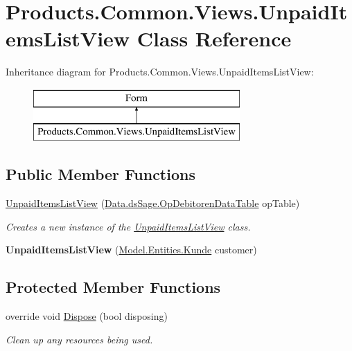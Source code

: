 \hypertarget{class_products_1_1_common_1_1_views_1_1_unpaid_items_list_view}{}\section{Products.\+Common.\+Views.\+Unpaid\+Items\+List\+View Class Reference}
\label{class_products_1_1_common_1_1_views_1_1_unpaid_items_list_view}
Inheritance diagram for Products.\+Common.\+Views.\+Unpaid\+Items\+List\+View\+:\begin{figure}[H]
\begin{center}
\leavevmode
\includegraphics[height=2.000000cm]{class_products_1_1_common_1_1_views_1_1_unpaid_items_list_view}
\end{center}
\end{figure}
\subsection*{Public Member Functions}
\begin{DoxyCompactItemize}
\item 
\hyperlink{class_products_1_1_common_1_1_views_1_1_unpaid_items_list_view_a734882d3f55ccf237a0fc40ab85863ac}{Unpaid\+Items\+List\+View} (\hyperlink{class_products_1_1_data_1_1ds_sage_1_1_op_debitoren_data_table}{Data.\+ds\+Sage.\+Op\+Debitoren\+Data\+Table} op\+Table)
\begin{DoxyCompactList}\small\item\em Creates a new instance of the \hyperlink{class_products_1_1_common_1_1_views_1_1_unpaid_items_list_view}{Unpaid\+Items\+List\+View} class. \end{DoxyCompactList}\item 
{\bfseries Unpaid\+Items\+List\+View} (\hyperlink{class_products_1_1_model_1_1_entities_1_1_kunde}{Model.\+Entities.\+Kunde} customer)\hypertarget{class_products_1_1_common_1_1_views_1_1_unpaid_items_list_view_a22af0bf6c6edf940989088a503f5e787}{}\label{class_products_1_1_common_1_1_views_1_1_unpaid_items_list_view_a22af0bf6c6edf940989088a503f5e787}

\end{DoxyCompactItemize}
\subsection*{Protected Member Functions}
\begin{DoxyCompactItemize}
\item 
override void \hyperlink{class_products_1_1_common_1_1_views_1_1_unpaid_items_list_view_a36fd187b3461b517daaa799cde6b5ae8}{Dispose} (bool disposing)
\begin{DoxyCompactList}\small\item\em Clean up any resources being used. \end{DoxyCompactList}\end{DoxyCompactItemize}


